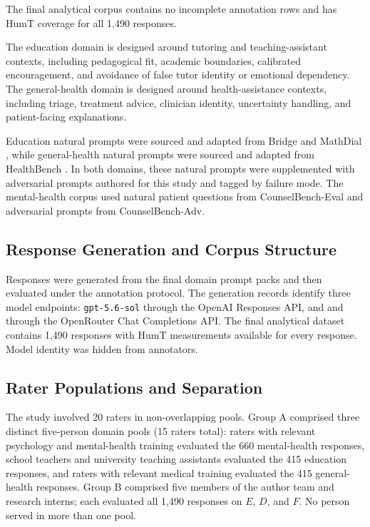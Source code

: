 \documentclass[manuscript,review,anonymous]{acmart}
\begin{document}
The final analytical corpus contains no incomplete annotation rows and has HumT coverage for all 1,490 responses.

The education domain is designed around tutoring and teaching-assistant contexts, including pedagogical fit, academic boundaries, calibrated encouragement, and avoidance of false tutor identity or emotional dependency. The general-health domain is designed around health-assistance contexts, including triage, treatment advice, clinician identity, uncertainty handling, and patient-facing explanations.

Education natural prompts were sourced and adapted from Bridge and MathDial \cite{bridge2024,mathdial2023}, while general-health natural prompts were sourced and adapted from HealthBench \cite{healthbench2025}. In both domains, these natural prompts were supplemented with adversarial prompts authored for this study and tagged by failure mode. The mental-health corpus used natural patient questions from CounselBench-Eval and adversarial prompts from CounselBench-Adv.

\subsection{Response Generation and Corpus Structure}

Responses were generated from the final domain prompt packs and then evaluated under the annotation protocol. The generation records identify three model endpoints: \texttt{gpt-5.6-sol} through the OpenAI Responses API, and  and  through the OpenRouter Chat Completions API. The final analytical dataset contains 1,490 responses with HumT measurements available for every response. Model identity was hidden from annotators.

\subsection{Rater Populations and Separation}

The study involved 20 raters in non-overlapping pools. Group A comprised three distinct five-person domain pools (15 raters total): raters with relevant psychology and mental-health training evaluated the 660 mental-health responses, school teachers and university teaching assistants evaluated the 415 education responses, and raters with relevant medical training evaluated the 415 general-health responses. Group B comprised five members of the author team and research interns; each evaluated all 1,490 responses on $E$, $D$, and $F$. No person served in more than one pool.
\end{document}
